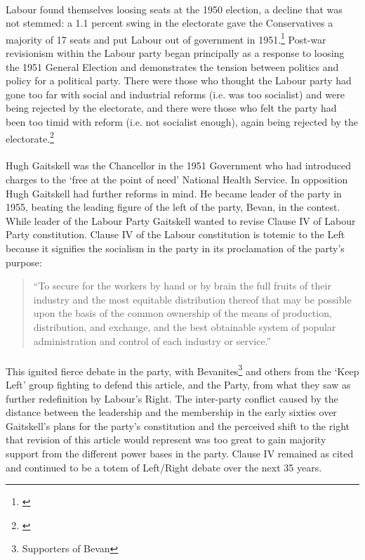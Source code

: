 \documentclass[13pt]{article}
\begin{document}
\begin{onehalfspace}
\paragraph{}Labour found themselves loosing seats at the 1950 election, a decline that was not stemmed: a 1.1 percent swing in the electorate gave the Conservatives a majority of 17 seats and put Labour out of government in 1951.\footnote{\cite{Pelling:1993qy}} Post-war revisionism within the Labour party began principally as a response to loosing the 1951 General Election and demonstrates the tension between politics and policy for a political party. There were those who thought the Labour party had gone too far with social and industrial reforms (i.e. was too socialist) and were being rejected by the electorate, and there were those who felt the party had been too timid with reform (i.e. not socialist enough), again being rejected by the electorate.\footnote{\cite[pp. 9] {Arblaster:2004mz}}

\paragraph{}Hugh Gaitskell was the Chancellor in the 1951 Government who had introduced charges to the `free at the point of need' National Health Service. In opposition Hugh Gaitskell had further reforms in mind. He became leader of the party in 1955, beating the leading figure of the left of the party, Bevan, in the contest. While leader of the Labour Party Gaitskell wanted to revise Clause IV of Labour Party constitution.  Clause IV of the Labour constitution is totemic to the Left because it signifies the socialism in the party in its proclamation of the party's purpose:

\begin{quotation}
``To secure for the workers by hand or by brain the full fruits of their industry and the most equitable distribution thereof that may be possible upon the basis of the common ownership of the means of production, distribution, and exchange, and the best obtainable system of popular administration and control of each industry or service.''
\end{quotation}

\paragraph{}This ignited fierce debate in the party, with Bevanites\footnote{Supporters of Bevan} and others from the `Keep Left' group fighting to defend this article, and the Party, from what they saw as further redefinition by Labour's Right. The inter-party conflict caused by the distance between the leadership and the membership in the early sixties over Gaitskell's plans for the party's constitution and the perceived shift to the right that revision of this article would represent was too great to gain majority support from the different power bases in the party. Clause IV remained as cited and continued to be a totem of Left/Right debate over the next 35 years.


\end{onehalfspace}
\end{document}

